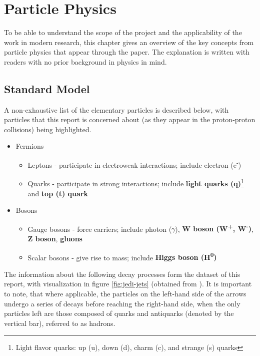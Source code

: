 \section{Particle Physics}
To be able to understand the scope of the project and the applicability of the work in modern research, this chapter gives an overview of the key concepts from particle physics that appear through the paper. The explanation is written with readers with no prior background in physics in mind.

\subsection{Standard Model}
A non-exhaustive list of the elementary particles is described below, with particles that this report is concerned about (as they appear in the proton-proton collisions) being highlighted.

\begin{itemize}[leftmargin=7mm]
  \item Fermions
  \begin{itemize}[leftmargin=5mm]
    \item Leptons - participate in electroweak interactions; include electron (e\textsuperscript{-})
    \item Quarks - participate in strong interactions; include \textbf{light quarks (q)}\footnote{Light flavor quarks: up (u), down (d), charm (c), and strange (s) quarks} and \textbf{top (t) quark}
  \end{itemize}
  \item Bosons
  \begin{itemize}[leftmargin=5mm]
    \item Gauge bosons - force carriers; include photon ($\gamma$), \textbf{W boson (W\textsuperscript{+}, W\textsuperscript{-})}, \textbf{Z boson}, \textbf{gluons}
    \item Scalar bosons - give rise to mass; include \textbf{Higgs boson (H\textsuperscript{0})}
  \end{itemize}
\end{itemize}

The information about the following decay processes form the dataset of this report, with visualization in figure \ref{fig:jedi-jets} (obtained from \cite{9-newman2019jedi-net:}). It is important to note, that where applicable, the particles on the left-hand side of the arrows undergo a series of decays before reaching the right-hand side, when the only particles left are those composed of quarks and antiquarks (denoted by the vertical bar), referred to as hadrons.

